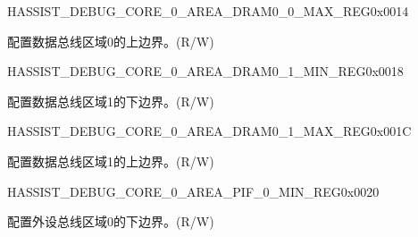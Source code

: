 \begin{register}{H}{ASSIST\_DEBUG\_CORE\_0\_AREA\_DRAM0\_0\_MAX\_REG}{0x0014}\label{regdesc:ASSISTDEBUGCORE0AREADRAM00MAXREG}
%
\regnewline%
\begin{regdesc}\begin{reglist}
\label{fielddesc:ASSISTDEBUGCORE0AREADRAM00MAX}\item [ASSIST\_DEBUG\_CORE\_0\_AREA\_DRAM0\_0\_MAX] 配置数据总线区域0的上边界。(R/W)
\end{reglist}\end{regdesc}
\end{register}


\begin{register}{H}{ASSIST\_DEBUG\_CORE\_0\_AREA\_DRAM0\_1\_MIN\_REG}{0x0018}\label{regdesc:ASSISTDEBUGCORE0AREADRAM01MINREG}
%
\regnewline%
\begin{regdesc}\begin{reglist}
\label{fielddesc:ASSISTDEBUGCORE0AREADRAM01MIN}\item [ASSIST\_DEBUG\_CORE\_0\_AREA\_DRAM0\_1\_MIN] 配置数据总线区域1的下边界。(R/W)
\end{reglist}\end{regdesc}
\end{register}


\begin{register}{H}{ASSIST\_DEBUG\_CORE\_0\_AREA\_DRAM0\_1\_MAX\_REG}{0x001C}\label{regdesc:ASSISTDEBUGCORE0AREADRAM01MAXREG}
%
\regnewline%
\begin{regdesc}\begin{reglist}
\label{fielddesc:ASSISTDEBUGCORE0AREADRAM01MAX}\item [ASSIST\_DEBUG\_CORE\_0\_AREA\_DRAM0\_1\_MAX] 配置数据总线区域1的上边界。(R/W)
\end{reglist}\end{regdesc}
\end{register}


\begin{register}{H}{ASSIST\_DEBUG\_CORE\_0\_AREA\_PIF\_0\_MIN\_REG}{0x0020}\label{regdesc:ASSISTDEBUGCORE0AREAPIF0MINREG}
%
\regnewline%
\begin{regdesc}\begin{reglist}
\label{fielddesc:ASSISTDEBUGCORE0AREAPIF0MIN}\item [ASSIST\_DEBUG\_CORE\_0\_AREA\_PIF\_0\_MIN] 配置外设总线区域0的下边界。(R/W)
\end{reglist}\end{regdesc}
\end{register}


